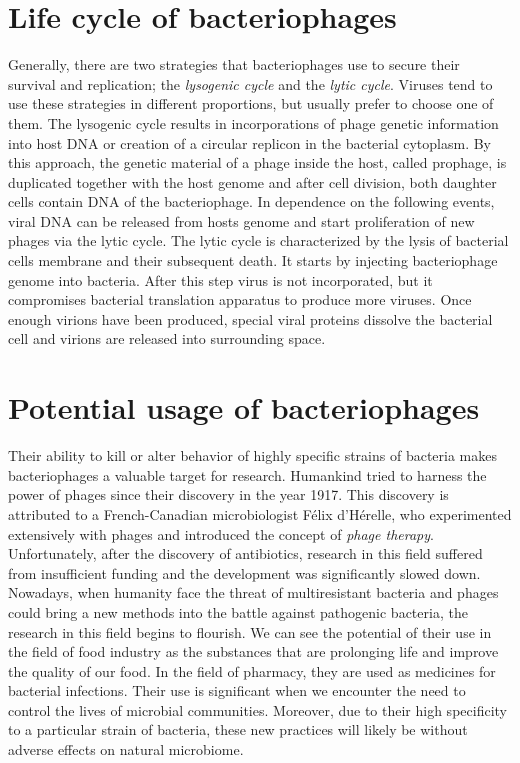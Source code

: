 \section{Life cycle of bacteriophages}
Generally, there are two strategies that bacteriophages use to secure their survival and replication; the \emph{lysogenic cycle} and the \emph{lytic cycle}.
Viruses tend to use these strategies in different proportions, but usually prefer to choose one of them.
The lysogenic cycle results in incorporations of phage genetic information into host DNA or creation of a circular replicon in the bacterial cytoplasm.
By this approach, the genetic material of a phage inside the host, called prophage, is duplicated together with the host genome and after cell division, both daughter cells contain DNA of the bacteriophage.
In dependence on the following events, viral DNA can be released from hosts genome and start proliferation of new phages via the lytic cycle.
The lytic cycle is characterized by the lysis of bacterial cells membrane and their subsequent death.
It starts by injecting bacteriophage genome into bacteria.
After this step virus is not incorporated, but it compromises bacterial translation apparatus to produce more viruses.
Once enough virions have been produced, special viral proteins dissolve the bacterial cell and virions are released into surrounding space.

\section{Potential usage of bacteriophages}
Their ability to kill or alter behavior of highly specific strains of bacteria makes bacteriophages a valuable target for research.
Humankind tried to harness the power of phages since their discovery in the year 1917.
This discovery is attributed to a French-Canadian microbiologist Félix d'Hérelle, who experimented extensively with phages and introduced the concept of \emph{phage therapy}\cite{phages_in_nature}.
Unfortunately, after the discovery of antibiotics, research in this field suffered from insufficient funding and the development was significantly slowed down.\\
Nowadays, when humanity face the threat of multiresistant bacteria and phages could bring a new methods into the battle against pathogenic bacteria, the research in this field begins to flourish.
We can see the potential of their use in the field of food industry as the substances that are prolonging life and improve the quality of our food. In the field of pharmacy, they are used as medicines for bacterial infections. Their use is significant when we encounter the need to control the lives of microbial communities.
Moreover, due to their high specificity to a particular strain of bacteria, these new practices will likely be without adverse effects on natural microbiome.

